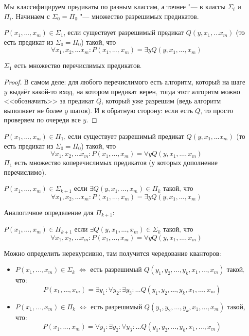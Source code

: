 Мы классифицируем предикаты по разным классам, а точнее "--- в классы $\Sigma_i$ и $\Pi_i$.
Начинаем с $\Sigma_0=\Pi_0$ "--- множество разрешимых предикатов.
\begin{Def}
	$P(x_1, \dots, x_m) \in \Sigma_1$, если существует разрешимый предикат $Q(y, x_1, \dots x_m)$
	(то есть предикат из $\Sigma_0 = \Pi_0$) такой, что
	\[
	\forall x_1, x_2, \dots x_m \colon P(x_1, \dots, x_m) = \exists y Q(y, x_1, \dots, x_m)
	\]
\end{Def}
\begin{Rem}
	$\Sigma_1$ есть множество перечислимых предикатов.
\end{Rem}
\begin{proof}
	В самом деле: для любого перечислимого есть алгоритм, который на шаге $y$ выдаёт какой-то
	вход, на котором предикат верен, тогда этот алгоритм можно <<обозначить>> за предикат $Q$,
	который уже разрешим (ведь алгоритм выполняет не более $y$ шагов).
	И в обратную сторону: если есть $Q$, то просто проверяем по очереди все $y$.
\end{proof}

\begin{Def}
  $P(x_1, \dots, x_m) \in \Pi_1$, если существует разрешимый предикат $Q(y, x_1, \dots x_m)$
  (то есть предикат из $\Sigma_0 = \Pi_0$) такой, что
  \[
  \forall x_1, x_2, \dots x_m \colon P(x_1, \dots, x_m) = \forall y Q(y, x_1, \dots, x_m)
  \]
  $\Pi_1$ есть множество коперечислимых предикатов (у которых дополнение перечислимо).
\end{Def}

\begin{Def}
	$P(x_1, \dots, x_m) \in \Sigma_{k+1}$ если $\exists Q(y, x_1, \dots, x_m) \in \Pi_k$ такой,
	что
	\[
	\forall x_1, x_2, \dots x_m \colon P(x_1, \dots, x_m) = \exists y Q(y, x_1, \dots, x_m)
	\]
\end{Def}
Аналогичное определение для $\Pi_{k+1}$:
\begin{Def}
	$P(x_1, \dots, x_m) \in \Pi_{k+1}$ если $\exists Q(y, x_1, \dots, x_m) \in \Sigma_k$ такой,
	что
	\[
	\forall x_1, x_2, \dots x_m \colon P(x_1, \dots, x_m) = \forall y Q(y, x_1, \dots, x_m)
	\]
\end{Def}
Можно определить нерекурсивно, там получится чередование кванторов:
\begin{itemize}
\item
	$P(x_1, \dots, x_m) \in \Sigma_k$ $\iff$ есть разрешимый $Q(y_1, y_2, \dots, y_k, x_1, \dots, x_m)$ такой, что:
	\[
		P(x_1, \dots, x_m) = \exists y_1 \colon \forall y_2 \colon \exists y_3 \colon \dots Q(y_1, y_2, \dots, y_k, x_1, \dots, x_m)
	\]
\item
	$P(x_1, \dots, x_m) \in \Pi_k$ $\iff$ есть разрешимый $Q(y_1, y_2, \dots, y_k, x_1, \dots, x_m)$ такой, что:
	\[
		P(x_1, \dots, x_m) = \forall y_1 \colon \exists y_2 \colon \forall y_3 \colon \dots Q(y_1, y_2, \dots, y_k, x_1, \dots, x_m)
	\]
\end{itemize}

